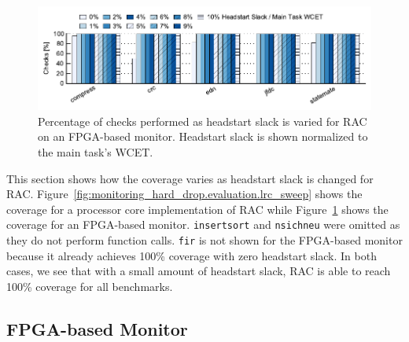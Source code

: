 \begin{figure}
  \begin{center}
    \includegraphics{monitoring_hard_drop/data/flex_lrc_sweep.pdf}
    \caption{Percentage of checks performed as headstart slack is varied for
    RAC on an FPGA-based monitor. Headstart slack is shown normalized to the
    main task's WCET.}
    \label{fig:monitoring_hard_drop.evaluation.flex_lrc_sweep}
  \end{center}
\end{figure}

This section shows how the coverage varies as headstart slack is changed for
RAC. Figure~\ref{fig:monitoring_hard_drop.evaluation.lrc_sweep} shows the
coverage for a processor core implementation of RAC while
Figure~\ref{fig:monitoring_hard_drop.evaluation.flex_lrc_sweep} shows the
coverage for an FPGA-based monitor. {\tt insertsort} and {\tt nsichneu} were
omitted as they do not perform function calls. {\tt fir} is not shown for the
FPGA-based monitor because it already achieves 100\% coverage with zero
headstart slack. In both cases, we see that with a small amount of headstart
slack, RAC is able to reach 100\% coverage for all benchmarks.

\subsection{FPGA-based Monitor}
\label{sec:monitoring_hard_drop.evaluation.fpga}


